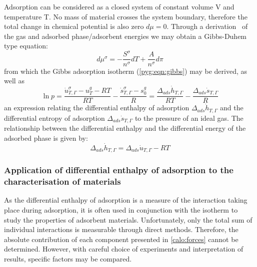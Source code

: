 Adsorption can be considered as a closed system of constant volume
V and temperature T. No mass of material crosses the system boundary,
therefore the total change in chemical potential is also
zero \(d\mu = 0\). Through
a derivation~\cite{rouquerolAdsorptionPowdersPorous2013} of the
gas and adsorbed phase/adsorbent energies we may obtain a
Gibbs-Duhem type equation:
%
\begin{equation}
	d \mu^{\sigma} = - \frac{S^{\sigma}}{n^{\sigma}} dT + \frac{A}{n^{\sigma}} d \pi
\end{equation}
%
from which the Gibbs adsorption isotherm (\autoref{pyg:eqn:gibbs}) may
be derived, as well as
%
\begin{equation}\label{calo:eqn:enthalpy}
	\ln p = \frac{\dot{u}_{T, \Gamma}^{\sigma} - u_T^g - RT}{RT} %
	- \frac{\dot{s}_{T, \Gamma}^{\sigma} - s^{g}_{0}}{R} %
	= \frac{\Delta_{ads} \dot{h}_{T, \Gamma}}{RT} - \frac{\Delta_{ads} \dot{s}_{T, \Gamma}}{R}
\end{equation}
%
an expression relating the differential enthalpy of adsorption
\(\Delta_{ads} \dot{h}_{T, \Gamma}\) and
the differential entropy of adsorption \(\Delta_{ads} \dot{s}_{T, \Gamma}\)
to the pressure of an ideal gas.
The relationship between the differential enthalpy and the differential energy
of the adsorbed phase is given by:
%
\begin{equation}
	\Delta_{ads} \dot{h}_{T, \Gamma} = \Delta_{ads} \dot{u}_{T, \Gamma} - RT
\end{equation}

\subsubsection{Application of differential enthalpy of adsorption to the characterisation of materials}

As the differential enthalpy of adsorption is a measure
of the interaction taking place during adsorption, it is often
used in conjunction with the isotherm to study the properties
of adsorbent materials.
Unfortunately, only the total sum of individual interactions
is measurable through direct methods. Therefore, the
absolute contribution of each component presented in
\autoref{calo:forces} cannot be determined.
However, with careful choice of experiments and interpretation
of results, specific factors may be compared.


